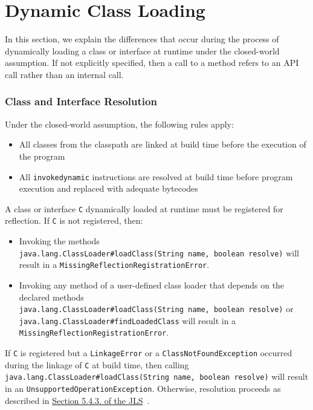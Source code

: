 \section{Dynamic Class Loading}
In this section, we explain the differences that occur during the process of dynamically loading a class or interface at runtime under the closed-world assumption. If not explicitly specified, then a call to a method refers to an API call rather than an internal call.

\subsubsection{Class and Interface Resolution}
Under the closed-world assumption, the following rules apply: 
\begin{itemize}
    \item All classes from the classpath are linked at build time before the execution of the program  
    \item All \texttt{invokedynamic} instructions are resolved at build time before program execution and replaced with adequate bytecodes
\end{itemize}

A class or interface \verb|C| dynamically loaded at runtime must be registered for reflection. If \verb|C| is not registered, then: 
\begin{itemize}
    \item Invoking the methods \texttt{java.lang.ClassLoader\#loadClass(String\ name,\ boolean\ resolve)} will result in a \texttt{MissingReflectionRegistrationError}. 
    \item Invoking any method of a user-defined class loader that depends on the declared methods \texttt{java.lang.ClassLoader\#loadClass(String\ name,\ boolean\ resolve)} or \texttt{java.lang.ClassLoader\#findLoadedClass} will result in a \texttt{MissingReflectionRegistrationError}.
\end{itemize}

If \verb|C| is registered but a \texttt{LinkageError} or a \texttt{ClassNotFoundException} occurred during the linkage of \verb|C| at build time, then calling \texttt{java.lang.ClassLoader\#loadClass(String\ name,\ boolean\ resolve)} will result in an \texttt{UnsupportedOperationException}. Otherwise, resolution proceeds as described in \href{https://docs.oracle.com/javase/specs/jvms/se21/html/jvms-5.html\#jvms-5.4.3}{Section
5.4.3. of the JLS}~\cite{noauthor_java_nodate-2}.

